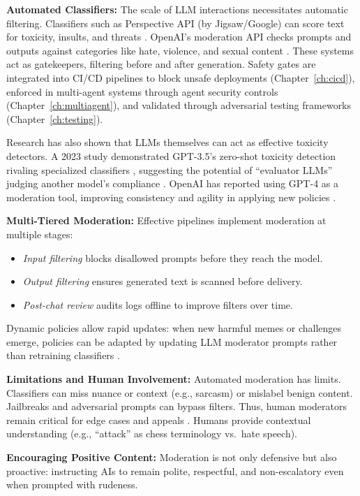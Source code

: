 \textbf{Automated Classifiers:} The scale of LLM interactions necessitates automatic filtering. Classifiers such as Perspective API (by Jigsaw/Google) can score text for toxicity, insults, and threats \cite{arxiv2023}. OpenAI's moderation API checks prompts and outputs against categories like hate, violence, and sexual content \cite{openai2023}. These systems act as gatekeepers, filtering before and after generation. Safety gates are integrated into CI/CD pipelines to block unsafe deployments (Chapter~\ref{ch:cicd}), enforced in multi-agent systems through agent security controls (Chapter~\ref{ch:multiagent}), and validated through adversarial testing frameworks (Chapter~\ref{ch:testing}).

Research has also shown that LLMs themselves can act as effective toxicity detectors. A 2023 study demonstrated GPT-3.5's zero-shot toxicity detection rivaling specialized classifiers \cite{medium2023}, suggesting the potential of ``evaluator LLMs'' judging another model's compliance \cite{bcg2023}. OpenAI has reported using GPT-4 as a moderation tool, improving consistency and agility in applying new policies \cite{openai2023}.

\textbf{Multi-Tiered Moderation:} Effective pipelines implement moderation at multiple stages:
\begin{itemize}
    \item \emph{Input filtering} blocks disallowed prompts before they reach the model.
    \item \emph{Output filtering} ensures generated text is scanned before delivery.
    \item \emph{Post-chat review} audits logs offline to improve filters over time.
\end{itemize}
Dynamic policies allow rapid updates: when new harmful memes or challenges emerge, policies can be adapted by updating LLM moderator prompts rather than retraining classifiers \cite{openai2023}.

\textbf{Limitations and Human Involvement:} Automated moderation has limits. Classifiers can miss nuance or context (e.g., sarcasm) or mislabel benign content. Jailbreaks and adversarial prompts can bypass filters. Thus, human moderators remain critical for edge cases and appeals \cite{dlacm2023}. Humans provide contextual understanding (e.g., ``attack'' as chess terminology vs.\ hate speech).

\textbf{Encouraging Positive Content:} Moderation is not only defensive but also proactive: instructing AIs to remain polite, respectful, and non-escalatory even when prompted with rudeness.

